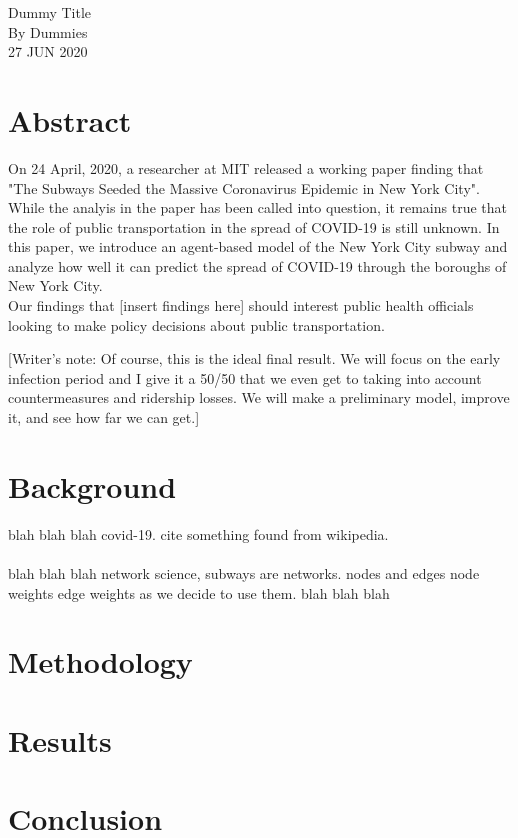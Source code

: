 \documentclass[12pt, a4, epsf] {article}
\theoremstyle{plain}
\theoremstyle{definition}
\begin{document}
\begin{center}

{\Large Dummy Title\\}
By Dummies \\
27 JUN 2020
\end{center}
\section*{Abstract}
On 24 April, 2020, a researcher at MIT released a working paper finding that "The Subways Seeded the Massive Coronavirus Epidemic in New York City". While the analyis in the paper has been called into question, it remains true that the role of public transportation in the spread of COVID-19 is still unknown. In this paper, we introduce an agent-based model of the New York City subway and analyze how well it can predict the spread of COVID-19 through the boroughs of New York City.\\

Our findings that [insert findings here] should interest public health officials looking to make policy decisions about public transportation.

[Writer's note: Of course, this is the ideal final result. We will focus on the early infection period and I give it a 50/50 that we even get to taking into account countermeasures and ridership losses. We will make a preliminary model, improve it, and see how far we can get.]

\section*{Background}
blah blah blah covid-19. cite something found from wikipedia.\\\\
blah blah blah network science, subways are networks. nodes and edges node weights edge weights as we decide to use them.
blah blah blah\\
\section*{Methodology}
\section*{Results}
\section*{Conclusion}
\nocite{*}
{}

\end{document}
